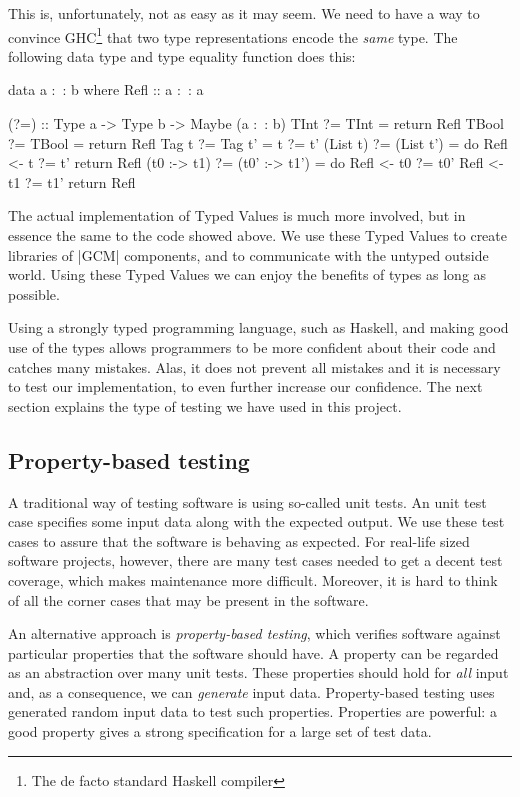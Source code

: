 \documentclass{article}
\begin{document}
This is, unfortunately, not as easy as it may seem. We need to have a way to
convince GHC\footnote{The de facto standard Haskell compiler} that two 
type representations encode the \emph{same} type. The following data type and
type equality function does this:
\begin{haskellcode}
data a :~: b where
  Refl :: a :~: a

(?=) :: Type a -> Type b -> Maybe (a :~: b)
TInt         ?= TInt       = return Refl
TBool        ?= TBool      = return Refl
Tag t        ?= Tag t'     = t ?= t'
(List t)     ?= (List t')  = do
  Refl <- t  ?= t'
  return Refl
(t0 :-> t1)  ?= (t0' :-> t1') = do
  Refl <- t0 ?= t0'
  Refl <- t1 ?= t1'
  return Refl
\end{haskellcode}
The actual implementation of Typed Values is much more involved, but in essence
the same to the code showed above. We use these Typed Values to create libraries
of |GCM| components, and to communicate with the untyped outside world. Using
these Typed Values we can enjoy the benefits of types as long as possible. 

Using a strongly typed programming language, such as Haskell, and making good
use of the types allows programmers to be more confident about their code and
catches many mistakes. Alas, it does not prevent all mistakes and it is
necessary to test our implementation, to even further increase our confidence.
The next section explains the type of testing we have used in this project.

\subsection{Property-based testing}

A traditional way of testing software is using so-called unit tests. An unit
test case specifies some input data along with the expected output. We use these
test cases to assure that the software is behaving as expected. For real-life
sized software projects, however, there are many test cases needed to get a
decent test coverage, which makes maintenance more difficult. Moreover, it is
hard to think of all the corner cases that may be present in the software.

An alternative approach is \emph{property-based testing}, which verifies
software against particular properties that the software should have. A property
can be regarded as an abstraction over many unit tests. These properties should
hold for \emph{all} input and, as a consequence, we can \emph{generate} input
data. Property-based testing uses generated random input data to test such
properties. Properties are powerful: a good property gives a strong
specification for a large set of test data. 
\end{document}
